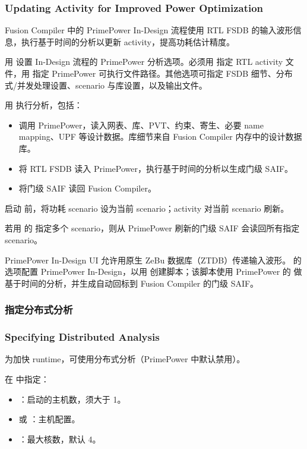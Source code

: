 \subsubsection*{Updating Activity for Improved Power Optimization}

Fusion Compiler 中的 PrimePower In-Design 流程使用 RTL FSDB 的输入波形信息，执行基于时间的分析以更新 activity，提高功耗估计精度。

用  设置 In-Design 流程的 PrimePower 分析选项。必须用  指定 RTL activity 文件，用  指定 PrimePower 可执行文件路径。其他选项可指定 FSDB 细节、分布式/并发处理设置、scenario 与库设置，以及输出文件。

用  执行分析，包括：
\begin{itemize}
  \item 调用 PrimePower，读入网表、库、PVT、约束、寄生、必要 name mapping、UPF 等设计数据。库细节来自 Fusion Compiler 内存中的设计数据库。
  \item 将 RTL FSDB 读入 PrimePower，执行基于时间的分析以生成门级 SAIF。
  \item 将门级 SAIF 读回 Fusion Compiler。
\end{itemize}

启动  前，将功耗 scenario 设为当前 scenario；activity 对当前 scenario 刷新。

若用  的  指定多个 scenario，则从 PrimePower 刷新的门级 SAIF 会读回所有指定 scenario。

PrimePower In-Design UI 允许用原生 ZeBu 数据库（ZTDB）传递输入波形。 的  选项配置 PrimePower In-Design，以用  创建脚本；该脚本使用 PrimePower 的  做基于时间的分析，并生成自动回标到 Fusion Compiler 的门级 SAIF。

\subsubsection{指定分布式分析}
\subsubsection*{Specifying Distributed Analysis}

为加快 runtime，可使用分布式分析（PrimePower 中默认禁用）。

在  中指定：
\begin{itemize}
  \item {}：启动的主机数，须大于 1。
  \item {} 或 ：主机配置。
  \item {}：最大核数，默认 4。
\end{itemize}

